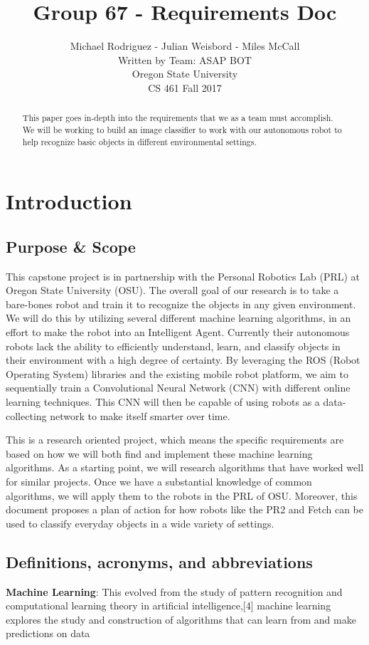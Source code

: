 \documentclass[draftclsnofoot, onecolumn, 10pt, compsoc]{IEEEtran}
\title{Group 67 - Requirements Doc}
\author{
			Michael Rodriguez - Julian Weisbord - Miles McCall \\
			Written by Team: ASAP BOT \\
        	    Oregon State University \\
        	    CS 461 Fall 2017
       }
\begin{document}
\maketitle

\begin{abstract}
This paper goes in-depth into the requirements that we as a team must accomplish. We will be working to build an image classifier to work with our autonomous robot to help recognize basic objects in different environmental settings. 
\end{abstract}
\newpage

\tableofcontents
\newpage

\section{Introduction}
\subsection{Purpose \& Scope}
This capstone project is in partnership with the Personal Robotics Lab (PRL) at Oregon State University (OSU). The overall goal of our research is to take a bare-bones robot and train it to recognize the objects in any given environment. We will do this by utilizing several different machine learning algorithms, in an effort to make the robot into an Intelligent Agent. Currently their autonomous robots lack the ability to efficiently understand, learn, and classify objects in their environment with a high degree of certainty. By leveraging the ROS (Robot Operating System) libraries and the existing mobile robot platform, we aim to sequentially train a Convolutional Neural Network (CNN) with different online learning techniques. This CNN will then be capable of using robots as a data-collecting network to make itself smarter over time. 

This is a research oriented project, which means the specific requirements are based on how we will both find and implement these machine learning algorithms. As a starting point, we will research algorithms that have worked well for similar projects. Once we have a substantial knowledge of common algorithms, we will apply them to the robots in the PRL of OSU. Moreover, this document proposes a plan of action for how robots like the PR2 and Fetch can be used to classify everyday objects in a wide variety of settings.

\subsection{Definitions, acronyms, and abbreviations}
\textbf{Machine Learning}: This evolved from the study of pattern recognition and computational learning theory in artificial intelligence,[4] machine learning explores the study and construction of algorithms that can learn from and make predictions on data
\end{document}
